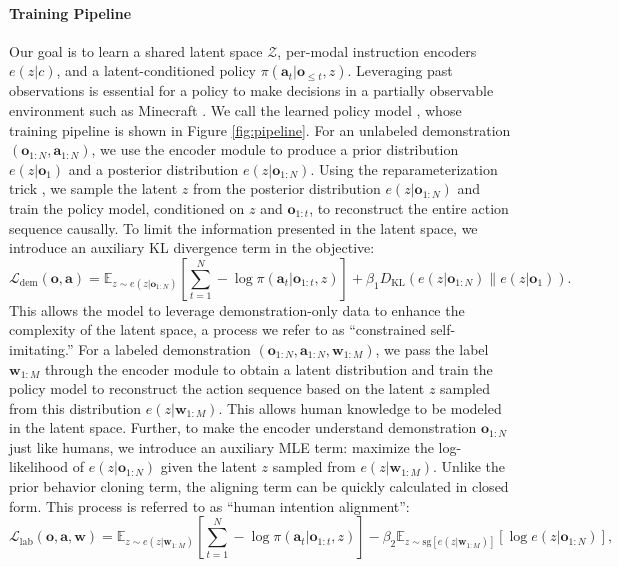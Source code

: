 \paragraph{Training Pipeline} Our goal is to learn a shared latent space $\mathcal{Z}$, per-modal instruction encoders $e(z | c)$, and a latent-conditioned policy $\pi(\mathbf{a}_t|\mathbf{o}_{\le t}, z)$. 
Leveraging past observations is essential for a policy to make decisions in a partially observable environment such as Minecraft \citep{malmo}. 
We call the learned policy model \agent, whose training pipeline is shown in Figure \ref{fig:pipeline}. 
For an unlabeled demonstration $(\mathbf{o}_{1:N}, \mathbf{a}_{1:N})$, we use the encoder module to produce a prior distribution $e(z | \mathbf{o}_{1})$ and a posterior distribution $e(z | \mathbf{o}_{1:N})$. Using the reparameterization trick \citep{vae}, we sample the latent $z$ from the posterior distribution $e(z|\mathbf{o}_{1:N})$ and train the policy model, conditioned on $z$ and $\mathbf{o}_{1:t}$, to reconstruct the entire action sequence causally. To limit the information presented in the latent space, we introduce an auxiliary KL divergence term in the objective:
\begin{equation}
    \mathcal{L}_{\text{dem}}(\mathbf{o}, \mathbf{a}) = \mathbb{E}_{z \sim e(z | \mathbf{o}_{1:N})} \left[ \sum_{t=1}^{N} -\log \pi(\mathbf{a}_t | \mathbf{o}_{1:t}, z) \right] + \beta_1 D_{\text{KL}}(e(z|\mathbf{o}_{1:N}) \parallel e(z | \mathbf{o}_{1})).
\end{equation}
This allows the model to leverage demonstration-only data to enhance the complexity of the latent space, a process we refer to as ``constrained self-imitating.'' 
For a labeled demonstration $(\mathbf{o}_{1:N}, \mathbf{a}_{1:N}, \mathbf{w}_{1:M})$, we pass the label $\mathbf{w}_{1:M}$ through the encoder module to obtain a latent distribution and train the policy model to reconstruct the action sequence based on the latent $z$ sampled from this distribution $e(z | \mathbf{w}_{1:M})$. This allows human knowledge to be modeled in the latent space. Further, to make the encoder understand demonstration $\mathbf{o}_{1:N}$ just like humans, we introduce an auxiliary MLE term: maximize the log-likelihood of $e(z|\mathbf{o}_{1:N})$ given the latent $z$ sampled from $e(z|\mathbf{w}_{1:M})$. Unlike the prior behavior cloning term, the aligning term can be quickly calculated in closed form. This process is referred to as ``human intention alignment'': 
\begin{equation}
    \mathcal{L}_{\text{lab}}(\mathbf{o}, \mathbf{a}, \mathbf{w}) = \mathbb{E}_{z \sim e(z|\mathbf{w}_{1:M})} \left[ \sum_{t=1}^{N} -\log \pi(\mathbf{a}_t | \mathbf{o}_{1:t}, z) \right] - \beta_2 
    \mathbb{E}_{z \sim \text{sg}[e(z|\mathbf{w}_{1:M})]} \left[\log e(z|\mathbf{o}_{1:N}) \right], 
\end{equation}
